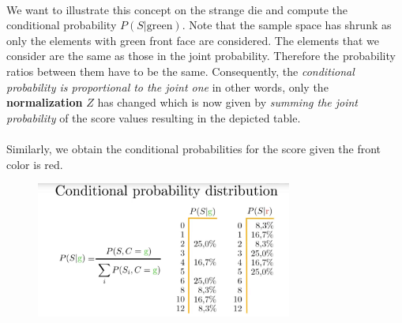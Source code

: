 \documentclass[12pt, a4paper]{scrartcl}
\begin{document}
\\

We want to illustrate this concept on the strange die and compute the conditional probability $P(S|\text{green})$.
Note that the sample space has shrunk as only the elements with green front face are considered.
The elements that we consider are the same as those in the joint probability. Therefore the probability ratios between them have to be the same.
Consequently, the \textit{conditional probability is proportional to the joint one} in other words, only the \textbf{normalization} $Z$ has changed which is now given by \textit{summing the joint probability} of the score values resulting in the depicted table.\\

\\[0.2cm]
Similarly, we obtain the conditional probabilities for the score given the front color is red.\\ %
\begin{figure}[H]
	\centering
	\includegraphics[width=0.75\textwidth]{3_6.png}
\end{figure}
\end{document}
